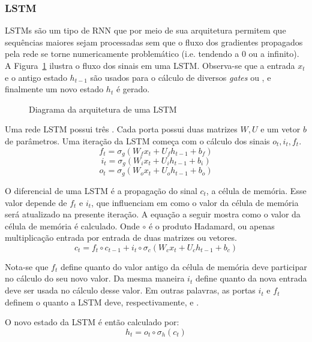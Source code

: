 \subsubsection{LSTM}
\label{sec:lstm}

LSTMs \citep{lstm} são um tipo de RNN que por meio de sua arquitetura permitem que sequências
maiores sejam processadas sem que o fluxo dos gradientes propagados pela rede se torne
numericamente problemático (i.e. tendendo a 0 ou a infinito). A
Figura~\ref{fig:lstm} ilustra o fluxo dos sinais em uma LSTM. Observa-se que a
entrada $x_t$ e o antigo estado $h_{t-1}$ são usados para o cálculo de diversos \textit{gates} ou , e
finalmente um novo estado $h_t$ é gerado.\\

\begin{figure}
\centering
\caption{Diagrama da arquitetura de uma LSTM}

\label{fig:lstm}
\end{figure}




Uma rede LSTM possui três . Cada porta possui duas matrizes $W,U$ e um
vetor $b$ de parâmetros. Uma iteração da LSTM começa com o cálculo dos sinais
$o_t,i_t,f_t$.\\

\[f_t = \sigma_g(W_fx_t + U_fh_{t-1} + b_f)\]
\[i_t = \sigma_g(W_ix_t + U_ih_{t-1} + b_i)\]
\[o_t = \sigma_g(W_ox_t + U_oh_{t-1} + b_o)\]

O diferencial de uma LSTM é a propagação do sinal $c_t$, a célula de memória.
Esse valor depende de $f_t$ e $i_t$, que influenciam em como o valor da
célula de memória será atualizado na presente iteração. A equação a seguir
mostra como o valor da célula de memória é calculado. Onde $\circ$ é o produto Hadamard, ou apenas multiplicação entrada por entrada de
duas matrizes ou vetores. \\

\[c_t = f_t \circ c_{t-1} + i_t \circ \sigma_c(W_cx_t + U_ch_{t-1} + b_c)\]

Nota-se que $f_t$
define quanto do valor antigo da célula de memória deve participar no cálculo do
seu novo valor. 
Da mesma maneira $i_t$ define quanto da nova entrada deve ser usada no cálculo desse valor.
Em outras palavras, as portas $i_t$ e $f_t$ definem o quanto a LSTM deve,
respectivamente,  e .


O novo estado da LSTM é então calculado por: \\
\[h_t = o_t \circ \sigma_h(c_t)\]




